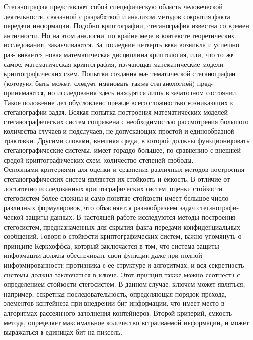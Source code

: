 \documentclass[a4paper,12pt]{article}
\theoremstyle{plain}
\begin{document}
Стеганография представляет собой специфическую область человеческой деятельности, связанной с
разработкой и анализом методов сокрытия факта передачи информации. Подобно криптографии,
стеганография известна со времен античности. Но на этом аналогии, по крайне мере в контексте
теоретических исследований, заканчиваются. За последние четверть века возникла и успешно раз-
вивается новая математическая дисциплина криптология, или, что то же самое, математическая
криптография, изучающая математические модели криптографических схем. Попытки создания ма-
тематической стеганографии (которую, быть может, следует именовать также стеганологией) пред-
принимаются, но исследования здесь находятся лишь в зачаточном состоянии.\\
Такое положение дел обусловлено прежде всего сложностью возникающих в стеганографии задач. Всякая попытка построения математических моделей стеганографических систем сопряжена с
необходимостью рассмотрения большого количества случаев и подслучаев, не допускающих простой
и единообразной трактовки. Другими словами, внешняя среда, в которой должны функционировать
стеганографические системы, имеет гораздо большее, по сравнению с внешней средой криптографических схем, количество степеней свободы.\\
Основными критериями для оценки и сравнения различных методов построения стеганографических систем являются их стойкость и емкость. В отличие от достаточно исследованных криптографических систем, оценки стойкости стегосистем более сложны и само понятие стойкости имеет большое число различных формулировок, что объясняется разнообразием задач стеганографи-ческой защиты данных. В настоящей работе исследуются методы построения стегосистем, предназначенных для скрытия факта передачи конфиденциальных сообщений. Говоря о стойкости криптографических систем, важно упомянуть о принципе Керкхоффса, который заключается в том, что система защиты информации должна обеспечивать свои функции даже при полной информированности противника о ее структуре и алгоритмах, и вся секретность системы должна заключаться в ключе. Этот принцип также можно соотнести с определением стойкости стегосистем. В данном случае, ключом может являться, например, секретная последовательность, определяющая порядок прохода, элементов контейнера при внедрении бит информации, что имеет место в алгоритмах рассеянного заполнения контейнеров. Второй критерий, емкость метода, определяет максимальное количество встраиваемой информации, и может выражаться в единицах бит на пиксель.


\newpage
\end{document}

